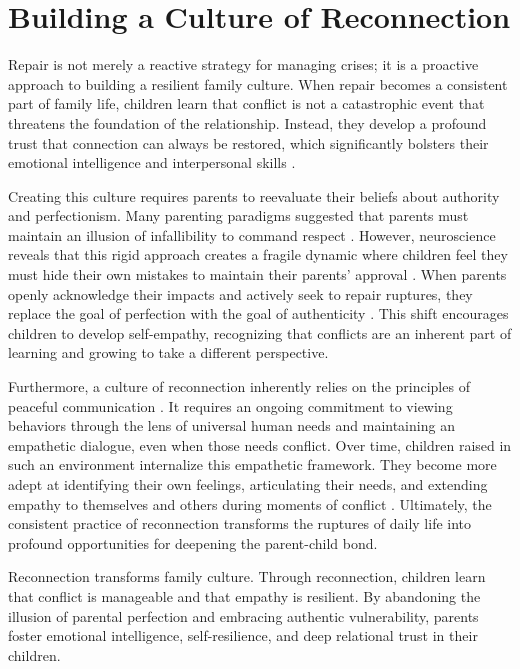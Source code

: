 \section{Building a Culture of Reconnection}

Repair is not merely a reactive strategy for managing crises; it is a proactive approach to building a resilient family culture.
When repair becomes a consistent part of family life, children learn that conflict is not a catastrophic event that threatens the foundation of the relationship.
Instead, they develop a profound trust that connection can always be restored, which significantly bolsters their emotional intelligence and interpersonal skills \citep{gottman1997}.

Creating this culture requires parents to reevaluate their beliefs about authority and perfectionism.
Many parenting paradigms suggested that parents must maintain an illusion of infallibility to command respect \citep{kohn2005}.
However, neuroscience reveals that this rigid approach creates a fragile dynamic where children feel they must hide their own mistakes to maintain their parents' approval \citep{siegel2011}.
When parents openly acknowledge their impacts and actively seek to repair ruptures, they replace the goal of perfection with the goal of authenticity \citep{brown2012}.
This shift encourages children to develop self-empathy, recognizing that conflicts are an inherent part of learning and growing to take a different perspective.

Furthermore, a culture of reconnection inherently relies on the principles of peaceful communication \citep{rosenberg2003}.
It requires an ongoing commitment to viewing behaviors through the lens of universal human needs and maintaining an empathetic dialogue, even when those needs conflict.
Over time, children raised in such an environment internalize this empathetic framework.
They become more adept at identifying their own feelings, articulating their needs, and extending empathy to themselves and others during moments of conflict \citep{hoffman2000}.
Ultimately, the consistent practice of reconnection transforms the ruptures of daily life into profound opportunities for deepening the parent-child bond.

\begin{keyinsight}
Reconnection transforms family culture.
Through reconnection, children learn that conflict is manageable and that empathy is resilient.
By abandoning the illusion of parental perfection and embracing authentic vulnerability, parents foster emotional intelligence, self-resilience, and deep relational trust in their children.
\end{keyinsight}


